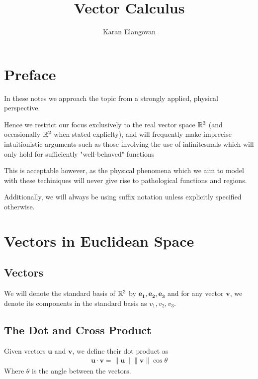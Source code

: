 \documentclass[]{article}
\title{Vector Calculus}
\author{Karan Elangovan}
\begin{document}
\maketitle

\doublespacing
\tableofcontents

\section{Preface}

In these notes we approach the topic from a strongly applied, physical perspective. 

Hence we restrict our focus exclusively to the real vector space $\mathbb{R}^3$ (and occasionally $\mathbb{R}^2$ when stated expliclty), and will frequently make imprecise intuitionistic arguments such as those involving the use of infinitesmals which will only hold for sufficiently "well-behaved" functions

This is acceptable however, as the physical phenomena which we aim to model with these techiniques will never give rise to pathological functions and regions.

Additionally, we will always be using suffix notation unless explicitly specified otherwise.

\section{Vectors in Euclidean Space}

\subsection{Vectors}

We will denote the standard basis of $\mathbb{R}^3$ by $\mathbf{e_1}, \mathbf{e_2}, \mathbf{e_3}$ and for any vector $\mathbf{v}$, we denote its components in the standard basis as $v_1,v_2,v_3$.

\subsection{The Dot and Cross Product}

\begin{defi} 
		Given vectors $\mathbf{u}$ and $\mathbf{v}$, we define their dot product as
		\begin{align*}
				\mathbf{u} \cdot \mathbf{v} = \|\mathbf{u}\| \|\mathbf{v}\| \cos\theta
		\end{align*}
		Where $\theta$ is the angle between the vectors.
\end{defi}
\end{document}
